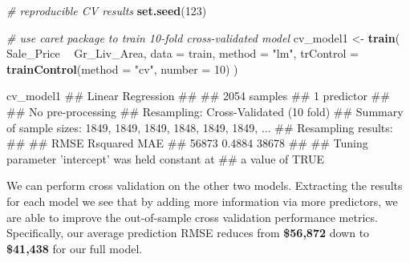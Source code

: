 \documentclass[]{book}
\newenvironment{Shaded}{\begin{snugshade}}{\end{snugshade}}
\newcommand{\CommentTok}[1]{\textcolor[rgb]{0.56,0.35,0.01}{\textit{#1}}}
\newcommand{\DataTypeTok}[1]{\textcolor[rgb]{0.13,0.29,0.53}{#1}}
\newcommand{\DecValTok}[1]{\textcolor[rgb]{0.00,0.00,0.81}{#1}}
\newcommand{\KeywordTok}[1]{\textcolor[rgb]{0.13,0.29,0.53}{\textbf{#1}}}
\newcommand{\NormalTok}[1]{#1}
\newcommand{\OperatorTok}[1]{\textcolor[rgb]{0.81,0.36,0.00}{\textbf{#1}}}
\newcommand{\StringTok}[1]{\textcolor[rgb]{0.31,0.60,0.02}{#1}}
\theoremstyle{definition}
\theoremstyle{definition}
\theoremstyle{definition}
\theoremstyle{remark}
\begin{document}
\begin{Shaded}
\begin{Highlighting}[]
\CommentTok{# reproducible CV results}
\KeywordTok{set.seed}\NormalTok{(}\DecValTok{123}\NormalTok{)}

\CommentTok{# use caret package to train 10-fold cross-validated model}
\NormalTok{cv_model1 <-}\StringTok{ }\KeywordTok{train}\NormalTok{(}
\NormalTok{  Sale_Price }\OperatorTok{~}\StringTok{ }\NormalTok{Gr_Liv_Area, }
  \DataTypeTok{data =}\NormalTok{ train, }
  \DataTypeTok{method =} \StringTok{"lm"}\NormalTok{,}
  \DataTypeTok{trControl =} \KeywordTok{trainControl}\NormalTok{(}\DataTypeTok{method =} \StringTok{"cv"}\NormalTok{, }\DataTypeTok{number =} \DecValTok{10}\NormalTok{)}
\NormalTok{  )}

\NormalTok{cv_model1}
\NormalTok{## Linear Regression }
\NormalTok{## }
\NormalTok{## 2054 samples}
\NormalTok{##    1 predictor}
\NormalTok{## }
\NormalTok{## No pre-processing}
\NormalTok{## Resampling: Cross-Validated (10 fold) }
\NormalTok{## Summary of sample sizes: 1849, 1849, 1849, 1848, 1849, 1849, ... }
\NormalTok{## Resampling results:}
\NormalTok{## }
\NormalTok{##   RMSE   Rsquared  MAE  }
\NormalTok{##   56873  0.4884    38678}
\NormalTok{## }
\NormalTok{## Tuning parameter 'intercept' was held constant at}
\NormalTok{##  a value of TRUE}
\end{Highlighting}
\end{Shaded}

We can perform cross validation on the other two models. Extracting the
results for each model we see that by adding more information via more
predictors, we are able to improve the out-of-sample cross validation
performance metrics. Specifically, our average prediction RMSE reduces
from \textbf{\$56,872} down to \textbf{\$41,438} for our full model.
\end{document}
